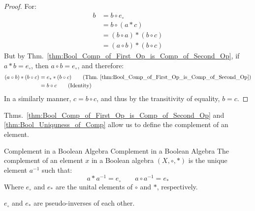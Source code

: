     \begin{proof}
        For:
        \begin{align*}
            b&=b\circ{e}_{\circ}
            \tag{Identity}\\
            &=b\circ(a*c)
            \tag{Hypothesis}\\
            &=(b\circ{a})*(b\circ{c})
            \tag{Distributivity}\\
            &=(a\circ{b})*(b\circ{c})
            \tag{Commutativity}
        \end{align*}
        But by Thm.~\ref{thm:Bool_Comp_of_First_Op_is_Comp_of_Second_Op},
        if $a*b=e_{\circ}$, then $a\circ{b}=e_{\circ}$, and therefore:
        \begin{align*}
            (a\circ{b})*(b\circ{c})
            &=e_{*}*(b\circ{c})
            \tag{Thm.~\ref{thm:Bool_Comp_of_First_Op_is_Comp_of_Second_Op}}\\
            &=b\circ{c}
            \tag{Identity}
        \end{align*}
        In a similarly manner, $c=b\circ{c}$, and thus by the transitivity
        of equality, $b=c$.
    \end{proof}
    Thms.~\ref{thm:Bool_Comp_of_First_Op_is_Comp_of_Second_Op} and
    \ref{thm:Bool_Uniquness_of_Comp} allow us to define the complement
    of an element.
    \begin{fdefinition}{Complement in a Boolean Algebra}
                       {Complement in a Boolean Algebra}
        The complement of an element $x$ in a Boolean algebra
        $(X,\circ,*)$ is the unique element $a^{\minus{1}}$ such that:
        \begin{equation*}
            a*a^{\minus{1}}=e_{\circ}
            \quad\quad
            a\circ{a}^{\minus{1}}=e_{*}
        \end{equation*}
        Where $e_{\circ}$ and $e_{*}$ are the \glspl{unital element} of
        $\circ$ and $*$, respectively.
    \end{fdefinition}
            \begin{theorem}
                $e_{\circ}$ and $e_{*}$ are pseudo-inverses of each other.
            \end{theorem}
